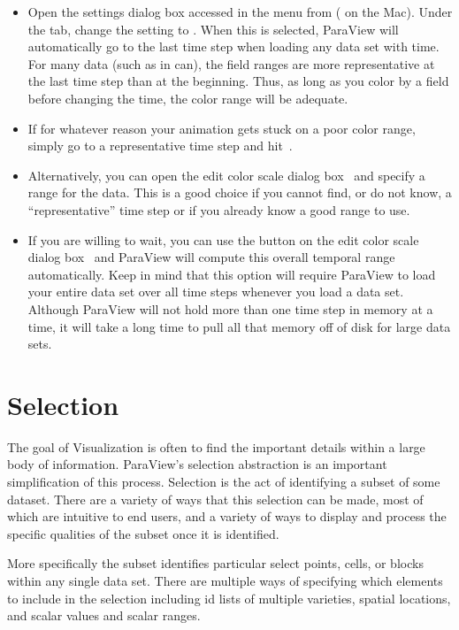 \begin{itemize}
\item Open the settings dialog box accessed in the menu from  \ra
   ( \ra {} on the Mac).  Under
  the  tab, change the  setting to .  When this is selected, ParaView will automatically go
  to the last time step when loading any data set with time.  For many data
  (such as in can), the field ranges are more representative at the last
  time step than at the beginning.  Thus, as long as you color by a field
  before changing the time, the color range will be adequate.
\item If for whatever reason your animation gets stuck on a poor color
  range, simply go to a representative time step and
  hit~.
\item Alternatively, you can open the edit color scale dialog
  box~ and specify a range for the data.  This is a
  good choice if you cannot find, or do not know, a ``representative'' time
  step or if you already know a good range to use.
\item If you are willing to wait, you can use the  button on the edit color scale dialog box~ and
  ParaView will compute this overall temporal range automatically.  Keep in
  mind that this option will require ParaView to load your entire data set
  over all time steps whenever you load a data set.  Although ParaView will
  not hold more than one time step in memory at a time, it will take a long
  time to pull all that memory off of disk for large data sets.
\end{itemize}


\section{Selection}

The goal of Visualization is often to find the important details within a
large body of information. ParaView's selection abstraction is an
important simplification of this process. Selection is the act of
identifying a subset of some dataset. There are a variety of ways that
this selection can be made, most of which are intuitive to end users,
and a variety of ways to display and process the specific qualities of
the subset once it is identified.

More specifically the subset identifies particular select points, cells, or
blocks within any single data set.  There are multiple ways of
specifying which elements to include in the selection including id
lists of multiple varieties, spatial locations, and scalar values and
scalar ranges.

